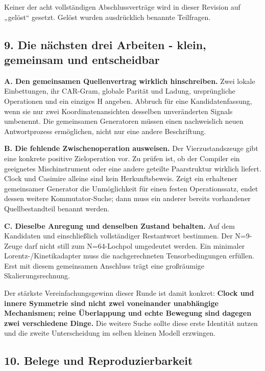 Keiner der acht vollständigen Abschlussverträge wird in dieser Revision
auf „gelöst`` gesetzt. Gelöst wurden ausdrücklich benannte Teilfragen.

\subsection{9. Die nächsten drei Arbeiten - klein, gemeinsam und
entscheidbar}\label{die-nuxe4chsten-drei-arbeiten---klein-gemeinsam-und-entscheidbar}

\textbf{A. Den gemeinsamen Quellenvertrag wirklich hinschreiben.} Zwei
lokale Einbettungen, ihr CAR-Gram, globale Parität und Ladung,
ursprüngliche Operationen und ein einziges H angeben. Abbruch für eine
Kandidatenfassung, wenn sie nur zwei Koordinatenansichten desselben
unveränderten Signals umbenennt. Die gemeinsamen Generatoren müssen
einen nachweislich neuen Antwortprozess ermöglichen, nicht nur eine
andere Beschriftung.

\textbf{B. Die fehlende Zwischenoperation ausweisen.} Der
Vierzustandszeuge gibt eine konkrete positive Zieloperation vor. Zu
prüfen ist, ob der Compiler ein geeignetes Mischinstrument oder eine
andere geteilte Paarstruktur wirklich liefert. Clock und Casimire
alleine sind kein Herkunftsbeweis. Zeigt ein erhaltener gemeinsamer
Generator die Unmöglichkeit für einen festen Operationssatz, endet
dessen weitere Kommutator-Suche; dann muss ein anderer bereits
vorhandener Quellbestandteil benannt werden.

\textbf{C. Dieselbe Anregung und denselben Zustand behalten.} Auf dem
Kandidaten  und  einschließlich
vollständiger Restantwort bestimmen. Der N=9-Zeuge darf nicht still zum
N=64-Lochpol umgedeutet werden. Ein minimaler Lorentz-/Kinetikadapter
muss die nachgerechneten Tensorbedingungen erfüllen. Erst mit diesem
gemeinsamen Anschluss trägt eine großräumige Skalierungsrechnung.

Der stärkste Vereinfachungsgewinn dieser Runde ist damit konkret:
\textbf{Clock und innere Symmetrie sind nicht zwei voneinander
unabhängige Mechanismen; reine Überlappung und echte Bewegung sind
dagegen zwei verschiedene Dinge.} Die weitere Suche sollte diese erste
Identität nutzen und die zweite Unterscheidung im selben kleinen Modell
erzwingen.

\subsection{10. Belege und
Reproduzierbarkeit}\label{belege-und-reproduzierbarkeit}

